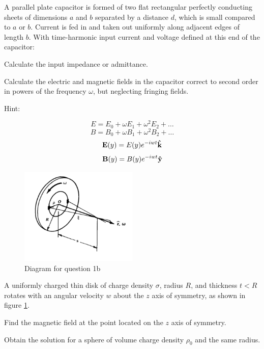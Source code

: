 \documentclass[
  course = {{Electricity and Magnetism 3}},
  term = {{4a Fall 2020}},
  assignment = 1,
  name = {{Andrew Kovachik}},
  studentnumber = {{20673849}},
  email = {{kovachik.andrew@gmail.com ; ajkovach@uwaterloo.ca}},
  firstexercise = 1
]{aga-homework}
\begin{document}
\exercise

\subexercise

A parallel plate capacitor is formed of two flat rectangular perfectly conducting sheets of
dimensions $a$ and $b$ separated by a distance $d$, which is small compared to $a$ or $b$. Current
is fed in and taken out uniformly along adjacent edges of length $b$. With time-harmonic input
current and voltage defined at this end of the capacitor:

\ssubexercise

Calculate the input impedance or admittance.


\ssubexercise

Calculate the electric and magnetic fields in the capacitor correct to second order in powers of the
frequency $\omega$, but neglecting fringing fields.

Hint:

$$
E = E_0 + \omega E_1+ \omega^2 E_2 + \dots
$$
$$
B = B_0 + \omega B_1+ \omega^2 B_2 + \dots
$$
$$
\vb{E}(y) = E(y)e^{-iwt}\vu{k}
$$
$$
\vb{B}(y) = B(y)e^{-iwt}\vu{y}
$$

\newpage
\subexercise

\begin{figure}[h]
    \centering
    \includegraphics[width=0.5\textwidth]{disk}
    \caption{Diagram for question 1b}
    \label{disk}
\end{figure}

A uniformly charged thin disk of charge density $\sigma$, radius $R$, and thickness $t<R$ rotates
with an angular velocity $w$ about the $z$ axis of symmetry, as shown in figure \ref{disk}. 

\ssubexercise

Find the magnetic field at the point located on the $z$ axis of symmetry.

\ssubexercise

Obtain the solution for a sphere of volume charge density $\rho_0$ and the same radius.
\end{document}
